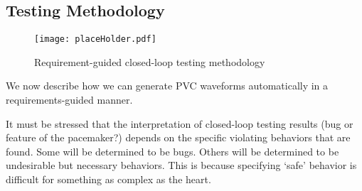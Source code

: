 \subsection{Testing Methodology}
\label{testingMethodology}

\begin{figure}[!t]
\centering
\texttt{[image: placeHolder.pdf]}
\caption{\small Requirement-guided closed-loop testing methodology}
\label{fig:reqGuidedTesting}
\end{figure} 

We now describe how we can generate PVC waveforms automatically in a requirements-guided manner.


It must be stressed that the interpretation of closed-loop testing results (bug or feature of the pacemaker?) depends on the specific violating behaviors that are found.
Some will be determined to be bugs. 
Others will be determined to be undesirable but necessary behaviors.
This is because specifying `safe' behavior is difficult for something as complex as the heart.
